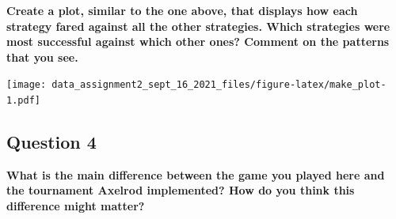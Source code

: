 \documentclass[
]{article}
\begin{document}
\textbf{Create a plot, similar to the one above, that displays how each
strategy fared against all the other strategies. Which strategies were
most successful against which other ones? Comment on the patterns that
you see.}

\texttt{[image: data\_assignment2\_sept\_16\_2021\_files/figure-latex/make\_plot-1.pdf]}

\hypertarget{question-4}{%
\subsection{Question 4}\label{question-4}}

\textbf{What is the main difference between the game you played here and
the tournament Axelrod implemented? How do you think this difference
might matter?}
\end{document}

